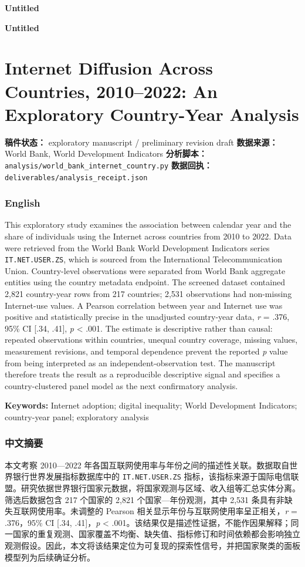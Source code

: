 \documentclass[12pt]{article}
\begin{document}
\begin{titlepage}
\centering
{\Large\bfseries Untitled\par}
\vfill
\end{titlepage}
\begin{center}\textbf{Untitled}\end{center}
\section{Internet Diffusion Across Countries, 2010–2022: An Exploratory Country-Year Analysis}
\textbf{稿件状态：} exploratory manuscript / preliminary revision draft \textbf{数据来源：} World Bank, World Development Indicators \textbf{分析脚本：} \texttt{analysis/world\_bank\_internet\_country.py} \textbf{数据回执：} \texttt{deliverables/analysis\_receipt.json}

\subsubsection{English}
This exploratory study examines the association between calendar year and the share of individuals using the Internet across countries from 2010 to 2022. Data were retrieved from the World Bank World Development Indicators series \texttt{IT.NET.USER.ZS}, which is sourced from the International Telecommunication Union. Country-level observations were separated from World Bank aggregate entities using the country metadata endpoint. The screened dataset contained 2,821 country-year rows from 217 countries; 2,531 observations had non-missing Internet-use values. A Pearson correlation between year and Internet use was positive and statistically precise in the unadjusted country-year data, \textit{r} = .376, 95\% CI [.34, .41], \textit{p} < .001. The estimate is descriptive rather than causal: repeated observations within countries, unequal country coverage, missing values, measurement revisions, and temporal dependence prevent the reported \textit{p} value from being interpreted as an independent-observation test. The manuscript therefore treats the result as a reproducible descriptive signal and specifies a country-clustered panel model as the next confirmatory analysis.

\textbf{Keywords:} Internet adoption; digital inequality; World Development Indicators; country-year panel; exploratory analysis

\subsubsection{中文摘要}
本文考察 2010—2022 年各国互联网使用率与年份之间的描述性关联。数据取自世界银行世界发展指标数据库中的 \texttt{IT.NET.USER.ZS} 指标，该指标来源于国际电信联盟。研究依据世界银行国家元数据，将国家观测与区域、收入组等汇总实体分离。筛选后数据包含 217 个国家的 2,821 个国家—年份观测，其中 2,531 条具有非缺失互联网使用率。未调整的 Pearson 相关显示年份与互联网使用率呈正相关，\textit{r} = .376，95\% CI [.34, .41]，\textit{p} < .001。该结果仅是描述性证据，不能作因果解释；同一国家的重复观测、国家覆盖不均衡、缺失值、指标修订和时间依赖都会影响独立观测假设。因此，本文将该结果定位为可复现的探索性信号，并把国家聚类的面板模型列为后续确证分析。
\end{document}
